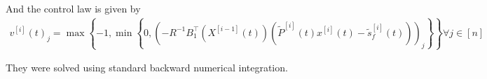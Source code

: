 \documentclass[3p,times]{article}
\begin{document}
And the control law is given by
\begin{align}
v^{[i]}(t)_j = \max \left\{ -1,\min\left\{0,\left( -R^{-1}B_1^\top\left(X^{[i-1]}(t)\right)\left(\tilde{P}^{[i]}(t)x^{[i]}(t)-\tilde{s}_f^{[i]}(t)\right)\right)_j \right\}\right\} \forall j \in [n]
\end{align} 

They were solved using standard backward numerical integration.
%
%
\end{document}
